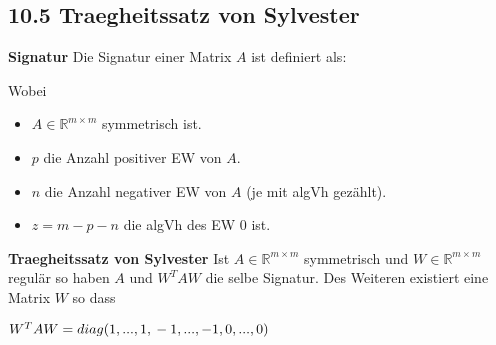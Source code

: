 \subsection{10.5 Traegheitssatz von Sylvester}{
\vskip1pt

\textbf{Signatur} \vskip1pt
Die Signatur einer Matrix $A$ ist definiert als:

\vspace{-2pt}
\begin{center}
\end{center}
\par
\vspace{-2pt}

Wobei
\vspace{-4pt}
\begin{itemize}[leftmargin=0.29cm, itemsep=0pt]
\item $A \in \mathbb{R}^{m \times m}$ symmetrisch ist.
\item $p$ die Anzahl positiver EW von $A$.
\item $n$ die Anzahl negativer EW von $A$ (je mit algVh gezählt).
\item $z = m-p-n$ die algVh des EW 0 ist.
\end{itemize}
\vskip2pt

\textbf{Traegheitssatz von Sylvester}\vskip2pt
Ist $A \in \mathbb{R}^{m \times m}$ symmetrisch und $W \in \mathbb{R}^{m \times m}$ regulär so haben $A$ und $W^TAW$ die selbe Signatur. Des Weiteren existiert eine Matrix $W$ so dass

\vspace{-2pt}
\begin{center}
$W^TAW = diag(\tikzmark[xshift=0,yshift=-6pt]{p_1} 1,...,1 \tikzmark[xshift=0,yshift=-6pt]{p_2}, \tikzmark[xshift=0,yshift=-6pt]{n_1} -1,...,-1 \tikzmark[xshift=0,yshift=-6pt]{n_2}, \tikzmark[xshift=0,yshift=-6pt]{z_1} 0,...,0 \tikzmark[xshift=0,yshift=-6pt]{z_2})$
\end{center}
\par\vskip4pt


}
\WhiteSpace